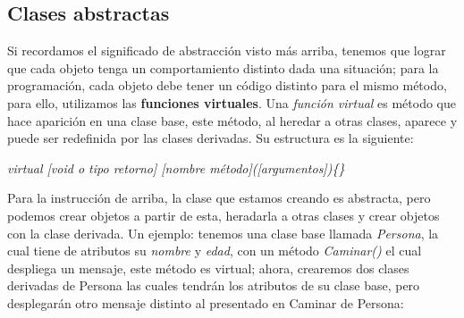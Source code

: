 \subsection{Clases abstractas}
Si recordamos el significado de abstracción visto más arriba, tenemos que lograr que cada objeto tenga un comportamiento distinto dada una situación; para la programación, cada objeto debe tener un código distinto para el mismo método, para ello, utilizamos las \textbf{funciones virtuales}. Una \textit{función virtual} es método que hace aparición en una clase base, este método, al heredar a otras clases, aparece y puede ser redefinida por las clases derivadas. Su estructura es la siguiente:\begin{center}\textit{virtual [void o tipo retorno] [nombre método]([argumentos])\{\}}\end{center}
Para la instrucción de arriba, la clase que estamos creando es abstracta, pero podemos crear objetos a partir de esta, heradarla a otras clases y crear objetos con la clase derivada. Un ejemplo: tenemos una clase base llamada \textit{Persona}, la cual tiene de atributos su \textit{nombre} y \textit{edad}, con un método \textit{Caminar()} el cual despliega un mensaje, este método es virtual; ahora, crearemos dos clases derivadas de Persona las cuales tendrán los atributos de su clase base, pero desplegarán otro mensaje distinto al presentado en Caminar de Persona:
